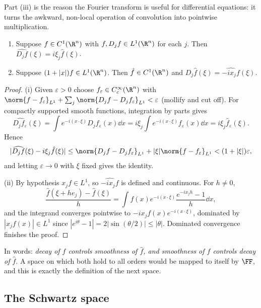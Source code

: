 Part (iii) is the reason the Fourier transform is useful for differential equations: it turns the awkward, non-local operation of convolution into pointwise multiplication.

\begin{theorem}\label{thm:ftderiv}
	\begin{enumerate}[label=(\roman*)]
		\item Suppose $f \in C^1(\R^n)$ with $f, D_jf \in L^1(\R^n)$ for each $j$. Then $\widehat{D_jf}(\xi) = i\xi_j \hat f(\xi)$.
		\item Suppose $(1+|x|)f \in L^1(\R^n)$. Then $\hat f \in C^1(\R^n)$ and $D_j \hat f(\xi) = \widehat{-ix_jf}(\xi)$.
	\end{enumerate}
\end{theorem}

\begin{proof}
	(i) Given $\varepsilon > 0$ choose $f_\varepsilon \in C_c^\infty(\R^n)$ with $\norm{f - f_\varepsilon}_{L^1}+\sum_j \norm{D_jf - D_jf_\varepsilon}_{L^1}<\varepsilon$ (mollify and cut off). For compactly supported smooth functions, integration by parts gives
	$$\widehat{D_jf_\varepsilon}(\xi) = \int e^{-i(x\cdot\xi)}D_jf_\varepsilon(x)\dd x = i\xi_j \int e^{-i(x\cdot\xi)}f_\varepsilon(x)\dd x = i\xi_j\hat f_\varepsilon(\xi).$$
	Hence
	$$|\widehat{D_jf}(\xi)-i\xi_j\hat f(\xi)| \le \norm{D_jf - D_jf_\varepsilon}_{L^1}+|\xi|\norm{f-f_\varepsilon}_{L^1}<(1+|\xi|)\varepsilon,$$
	and letting $\varepsilon \to 0$ with $\xi$ fixed gives the identity.

	(ii) By hypothesis $x_jf \in L^1$, so $\widehat{-ix_jf}$ is defined and continuous. For $h \ne 0$,
	$$\frac{\hat f(\xi+he_j)-\hat f(\xi)}{h} = \int f(x)e^{-i(x\cdot\xi)}\frac{e^{-ix_jh}-1}{h}\dd x,$$
	and the integrand converges pointwise to $-ix_jf(x)e^{-i(x\cdot\xi)}$, dominated by $|x_jf(x)| \in L^1$ since $|e^{i\theta}-1| = 2|\sin(\theta/2)|\le|\theta|$. Dominated convergence finishes the proof.
\end{proof}

In words: \emph{decay of $f$ controls smoothness of $\hat f$, and smoothness of $f$ controls decay of $\hat f$}. A space on which both hold to all orders would be mapped to itself by $\FF$, and this is exactly the definition of the next space.

\subsection{The Schwartz space}

